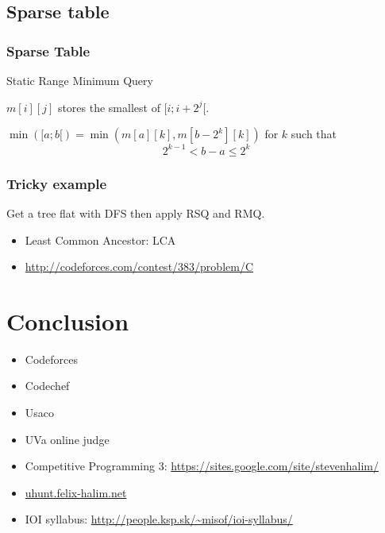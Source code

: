 \documentclass[10pt,svgnames,usenames,table]{beamer} %
\begin{document}
\subsection{Sparse table}
\begin{frame}
  \frametitle{Sparse Table}
  Static Range Minimum Query

  $m[i][j]$ stores the smallest of $[i;i+2^j[$.

  $\min([a; b[) = \min(m[a][k], m[b-2^k][k])$ for $k$ such that
  $$2^{k-1} < b-a \leq 2^k$$
\end{frame}

\begin{frame}
  \frametitle{Tricky example}
  Get a tree flat with DFS then apply RSQ and RMQ.
  \begin{itemize}
    \item Least Common Ancestor: LCA
    \item \url{http://codeforces.com/contest/383/problem/C}
  \end{itemize}
\end{frame}

\section{Conclusion}

\begin{frame}
  \begin{itemize}
    \item Codeforces
    \item Codechef
    \item Usaco
    \item UVa online judge
    \item Competitive Programming 3: \url{https://sites.google.com/site/stevenhalim/}
    \item \url{uhunt.felix-halim.net}
    \item IOI syllabus: \url{http://people.ksp.sk/~misof/ioi-syllabus/}
  \end{itemize}
\end{frame}
\end{document}
